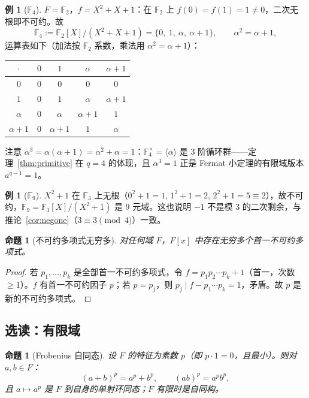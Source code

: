 \documentclass[a4paper,11pt]{ctexart}
\numberwithin{equation}{section}
\theoremstyle{plain}
\newtheorem{proposition}[theorem]{命题}
\theoremstyle{definition}
\newtheorem{example}[theorem]{例}
\theoremstyle{remark}
\newcommand{\F}{\mathbb{F}}
\begin{document}
\begin{example}[$\F_4$]
$F=\F_2$，$f=X^2+X+1$：在 $\F_2$ 上 $f(0)=f(1)=1\neq0$，二次无根即不可约。故
\[
\F_4:=\F_2[X]/(X^2+X+1)=\{0,\ 1,\ \alpha,\ \alpha+1\},\qquad \alpha^2=\alpha+1,
\]
运算表如下（加法按 $\F_2$ 系数，乘法用 $\alpha^2=\alpha+1$）：
\begin{center}
\begin{tabular}{c|cccc}
$\cdot$ & $0$ & $1$ & $\alpha$ & $\alpha+1$\\ \hline
$0$ & $0$ & $0$ & $0$ & $0$ \\
$1$ & $0$ & $1$ & $\alpha$ & $\alpha+1$ \\
$\alpha$ & $0$ & $\alpha$ & $\alpha+1$ & $1$ \\
$\alpha+1$ & $0$ & $\alpha+1$ & $1$ & $\alpha$ \\
\end{tabular}
\end{center}
注意 $\alpha^3=\alpha(\alpha+1)=\alpha^2+\alpha=1$：$\F_4^{\times}=\langle\alpha\rangle$ 是 $3$ 阶循环群——定理~\ref{thm:primitive} 在 $q=4$ 的体现，且 $\alpha^3=1$ 正是 Fermat 小定理的有限域版本 $a^{q-1}=1$。
\end{example}

\begin{example}[$\F_9$]
$X^2+1$ 在 $\F_3$ 上无根（$0^2+1=1$, $1^2+1=2$, $2^2+1=5\equiv2$），故不可约，$\F_9=\F_3[X]/(X^2+1)$ 是 $9$ 元域。这也说明 $-1$ 不是模 $3$ 的二次剩余，与推论~\ref{cor:negone}（$3\equiv3\pmod4$）一致。
\end{example}

\begin{proposition}[不可约多项式无穷多]\label{prop:infirred}
对任何域 $F$，$F[x]$ 中存在无穷多个首一不可约多项式。
\end{proposition}

\begin{proof}
若 $p_1,\dots,p_k$ 是全部首一不可约多项式，令 $f=p_1p_2\cdots p_k+1$（首一，次数 $\ge1$）。$f$ 有首一不可约因子 $p$；若 $p=p_j$，则 $p_j\mid f-p_1\cdots p_k=1$，矛盾。故 $p$ 是新的不可约多项式。
\end{proof}

\subsection{选读：有限域}

\begin{proposition}[Frobenius 自同态]\label{prop:frob}
设 $F$ 的特征为素数 $p$（即 $p\cdot1=0$，且最小）。则对 $a,b\in F$：
\[
(a+b)^p=a^p+b^p,\qquad (ab)^p=a^pb^p,
\]
且 $a\mapsto a^p$ 是 $F$ 到自身的单射环同态；$F$ 有限时是自同构。
\end{proposition}
\end{document}

